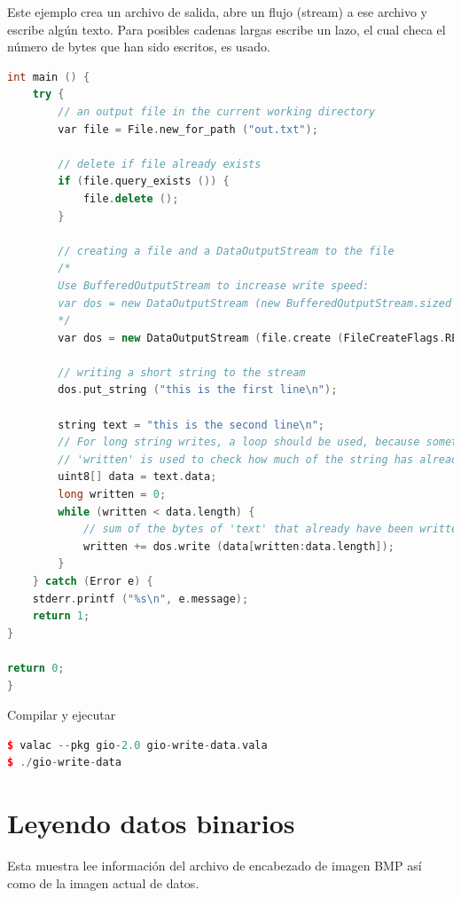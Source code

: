 \documentclass[12pt,twoside]{book}
\begin{document}
Este ejemplo crea un archivo de salida, abre un flujo (stream) a ese archivo y escribe algún texto. Para posibles cadenas largas escribe un lazo, el cual checa el número de bytes que han sido escritos, es usado.


\begin{lstlisting}[language=C++]
int main () {
	try {
		// an output file in the current working directory
		var file = File.new_for_path ("out.txt");
		
		// delete if file already exists
		if (file.query_exists ()) {
			file.delete ();
		}
		
		// creating a file and a DataOutputStream to the file
		/*
		Use BufferedOutputStream to increase write speed:
		var dos = new DataOutputStream (new BufferedOutputStream.sized (file.create (FileCreateFlags.REPLACE_DESTINATION), 65536));
		*/
		var dos = new DataOutputStream (file.create (FileCreateFlags.REPLACE_DESTINATION));
		
		// writing a short string to the stream
		dos.put_string ("this is the first line\n");
		
		string text = "this is the second line\n";
		// For long string writes, a loop should be used, because sometimes not all data can be written in one run
		// 'written' is used to check how much of the string has already been written
		uint8[] data = text.data;
		long written = 0;
		while (written < data.length) { 
			// sum of the bytes of 'text' that already have been written to the stream
			written += dos.write (data[written:data.length]);
		}
	} catch (Error e) {
	stderr.printf ("%s\n", e.message);
	return 1;
}

return 0;
}
\end{lstlisting}

Compilar y ejecutar

\begin{lstlisting}[language=C++]
$ valac --pkg gio-2.0 gio-write-data.vala
$ ./gio-write-data
\end{lstlisting}


\section{Leyendo datos binarios}

Esta muestra lee información del archivo de encabezado de imagen BMP así como de la imagen actual de datos.
 
\end{document}

